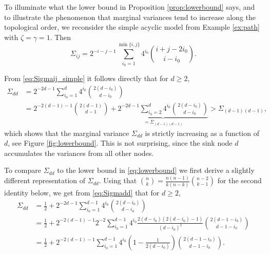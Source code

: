 \documentclass[10pt,twoside,a4paper]{amsart}
\begin{document}
\begin{ex} \label{ex:simple}
    To illuminate what the lower bound in Proposition \ref{prop:lowerbound}
    says, and to illustrate the phenomenon that marginal variances tend to increase along 
    the topological order, we reconsider the simple acyclic model
    from Example \ref{ex:path} with $\zeta = \gamma = 1$. Then 
    \begin{equation} \label{eq:Sigmaij_simple}
        \Sigma_{ij} =  2^{-i - j - 1} \sum_{i_0=1}^{\min\{i,j\}} 4^{i_0}
        {i + j - 2i_0 \choose i - i_0}.
    \end{equation}
    
    From \eqref{eq:Sigmaij_simple} it follows directly that for $d \geq 2$,
    \begin{align}
            \Sigma_{dd} & = 2^{-2d - 1} \sum_{i_0=1}^{d} 4^{i_0}
        {2(d - i_0) \choose d - i_0} \label{eq:Sigmadd} \\
        & = 2^{-2(d-1)-1}\binom{2(d-1)}{d-1} + \underbrace{2^{-2d-1} \sum_{i_0=2}^d 4^{i_0} \binom{2(d-i_0)}{d-i_0}}_{ =  \Sigma_{(d-1)(d-1)}} > \Sigma_{(d-1)(d-1)}, \nonumber 
    \end{align}
    which shows that the marginal variance $\Sigma_{dd}$ is strictly increasing 
    as a function of $d$, see Figure \ref{fig:lowerbound}. This is not surprising, since the
    sink node $d$ accumulates the variances from all other nodes.
     
    To compare $\Sigma_{dd}$ to the lower bound in \eqref{eq:lowerbound}    
    we first derive a slightly different representation of $\Sigma_{dd}$. 
    Using that ${n \choose k} = \frac{n(n-1)}{k(n - k)} {n-2 \choose k-1}$ 
    for the second identity below, we get from \eqref{eq:Sigmadd} 
    that for $d \geq 2$,
    \begin{align*}
        \Sigma_{dd} 
        & =  \frac{1}{2} + 2^{-2d - 1}  \sum_{i_0=1}^{d-1} 4^{i_0}
        {2(d - i_0) \choose d - i_0} \\
        & = \frac{1}{2} + 2^{-2(d-1) - 1} 2^{-2} \sum_{i_0=1}^{d-1} 4^{i_0}
        \frac{2(d - i_0)(2(d - i_0) - 1)}{(d - i_0)^2} {2(d - 1 - i_0) \choose d - 1 - i_0} \\ 
        & = \frac{1}{2} + 2^{-2(d-1) - 1} \sum_{i_0=1}^{d-1} 4^{i_0}
        \left(1 - \frac{1}{2(d - i_0)}\right) {2(d - 1 - i_0) \choose d - 1 - i_0}. \\
    \end{align*}



\end{ex}
\end{document}
